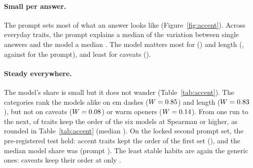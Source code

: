 \documentclass[11pt]{article}
\begin{document}
\begin{table}[t]
\centering\small
\caption{The accent, trait by trait. Model and prompt shares of the variation between single answers (run \texttt{oct-23-26}); Kendall's $W$ of the model order across the \nCategories{} categories; and the Spearman correlation of the six model means with the next run (\texttt{oct-14-26} to \texttt{oct-23-26}) and with the locked second prompt set. Right: the eight-model test (Section~\ref{sec:eight}), the model share with eight models and the Spearman correlation of the eight model means on the second prompt set; its behaviors were labeled by a different coder pair.}
\label{tab:accent}
\resizebox{\linewidth}{!}{}
\end{table}

\paragraph{Small per answer.}
The prompt sets most of what an answer looks like (Figure~\ref{fig:accent}).
Across \accentNTraits{} everyday traits, the prompt explains a median \accentMedPrompt{} of the variation between single answers and the model a median \accentMedModel{}.
The model matters most for \accentTopTrait{} (\accentTopShare{}) and length (\accentLengthShare{}, against \accentLengthPrompt{} for the prompt), and least for caveats (\accentCaveatShare{}).

\paragraph{Steady everywhere.}
The model's share is small but it does not wander (Table~\ref{tab:accent}).
The categories rank the models alike on em dashes ($W=0.85$) and length ($W=0.83$), but not on caveats ($W=0.08$) or warm openers ($W=0.14$).
From one run to the next, \accentRtHigh{} of \accentRtN{} traits keep the order of the six models at Spearman \accentRtThreshold{} or higher, as rounded in Table~\ref{tab:accent} (median \accentRtMedian{}).
On the locked second prompt set, the pre-registered test held: \vTwoAccentPass{} accent traits kept the order of the first set (\vTwoAccentList{}), and the median model share was \vTwoMedModel{} (prompt \vTwoMedPrompt{}).
The least stable habits are again the generic ones: caveats keep their order at only \vTwoCaveatRt{}.
\end{document}

